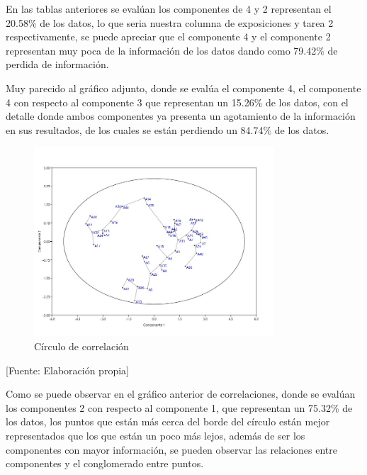 En las tablas anteriores se evalúan los componentes de 4 y 2 representan el 20.58\% de los datos, lo que seria nuestra columna de exposiciones y tarea 2 respectivamente, se puede apreciar que el componente 4 y el componente 2 representan muy poca de la información de los datos dando como 79.42\% de perdida de información. 

Muy parecido al gráfico adjunto, donde se evalúa el componente 4, el componente 4 con respecto al componente 3 que representan un 15.26\% de los datos, con el detalle donde ambos componentes ya presenta un agotamiento de la información en sus resultados, de los cuales se están perdiendo un 84.74\% de los datos.  


\begin{figure}[H]
        \centering
        \caption{Círculo de correlación}
        \includegraphics[width=0.8\textwidth]{figures/CirculoCorrelacion.jpg}
        
\end{figure}
\begin{center}
    [Fuente:  Elaboración propia]
\end{center}

Como se puede observar en el gráfico anterior de correlaciones, donde se evalúan los componentes 2 con respecto al componente 1, que representan un 75.32\% de los datos, los puntos que están más cerca del borde del círculo están mejor representados que los que están un poco más lejos, además de ser los componentes con mayor información, se pueden observar las relaciones entre componentes y el conglomerado entre puntos.  



